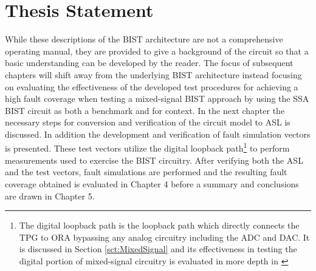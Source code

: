 \documentclass[12pt]{report}
\begin{document}
\section{Thesis Statement}
While these descriptions of the BIST architecture are not a comprehensive operating manual, they are provided to give a background of the circuit so that a basic understanding can be developed by the reader.  The focus of subsequent chapters will shift away from the underlying BIST architecture instead focusing on evaluating the effectiveness of the developed test procedures for achieving a high fault coverage when testing a mixed-signal BIST approach by using the SSA BIST circuit as both a benchmark and for context.  In the next chapter the necessary steps for conversion and verification of the circuit model to ASL is discussed.  In addition the development and verification of fault simulation vectors is presented.  These test vectors utilize the digital loopback path\footnote{The digital loopback path is the loopback path which directly connects the TPG to ORA bypassing any analog circuitry including the ADC and DAC.  It is discussed in Section \ref{sct:MixedSignal} and its effectiveness in testing the digital portion of mixed-signal circuitry is evaluated in more depth in \cite{stroud-analog}} to perform measurements used to exercise the BIST circuitry.  After verifying both the ASL and the test vectors, fault simulations are performed and the resulting fault coverage obtained is evaluated in Chapter 4 before a summary and conclusions are drawn in Chapter 5. 
\end{document}
